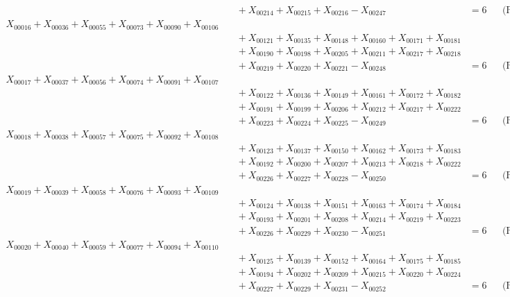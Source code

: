 \documentclass[a4paper,10pt]{article}
\begin{document}
{\begin{align}
&\quad  + X_{00214} + X_{00215} + X_{00216} - X_{00247} &= 6 && \text{(R00016)} \\
X_{00016} + X_{00036} + X_{00055} + X_{00073} + X_{00090} + X_{00106} \\[0.5ex]
&\quad  + X_{00121} + X_{00135} + X_{00148} + X_{00160} + X_{00171} + X_{00181} \\[0.5ex]
&\quad  + X_{00190} + X_{00198} + X_{00205} + X_{00211} + X_{00217} + X_{00218} \\[0.5ex]
&\quad  + X_{00219} + X_{00220} + X_{00221} - X_{00248} &= 6 && \text{(R00017)} \\
X_{00017} + X_{00037} + X_{00056} + X_{00074} + X_{00091} + X_{00107} \\[0.5ex]
&\quad  + X_{00122} + X_{00136} + X_{00149} + X_{00161} + X_{00172} + X_{00182} \\[0.5ex]
&\quad  + X_{00191} + X_{00199} + X_{00206} + X_{00212} + X_{00217} + X_{00222} \\[0.5ex]
&\quad  + X_{00223} + X_{00224} + X_{00225} - X_{00249} &= 6 && \text{(R00018)} \\
X_{00018} + X_{00038} + X_{00057} + X_{00075} + X_{00092} + X_{00108} \\[0.5ex]
&\quad  + X_{00123} + X_{00137} + X_{00150} + X_{00162} + X_{00173} + X_{00183} \\[0.5ex]
&\quad  + X_{00192} + X_{00200} + X_{00207} + X_{00213} + X_{00218} + X_{00222} \\[0.5ex]
&\quad  + X_{00226} + X_{00227} + X_{00228} - X_{00250} &= 6 && \text{(R00019)} \\
X_{00019} + X_{00039} + X_{00058} + X_{00076} + X_{00093} + X_{00109} \\[0.5ex]
&\quad  + X_{00124} + X_{00138} + X_{00151} + X_{00163} + X_{00174} + X_{00184} \\[0.5ex]
&\quad  + X_{00193} + X_{00201} + X_{00208} + X_{00214} + X_{00219} + X_{00223} \\[0.5ex]
&\quad  + X_{00226} + X_{00229} + X_{00230} - X_{00251} &= 6 && \text{(R00020)} \\
\allowbreak
X_{00020} + X_{00040} + X_{00059} + X_{00077} + X_{00094} + X_{00110} \\[0.5ex]
&\quad  + X_{00125} + X_{00139} + X_{00152} + X_{00164} + X_{00175} + X_{00185} \\[0.5ex]
&\quad  + X_{00194} + X_{00202} + X_{00209} + X_{00215} + X_{00220} + X_{00224} \\[0.5ex]
&\quad  + X_{00227} + X_{00229} + X_{00231} - X_{00252} &= 6 && \text{(R00021)} \\

\end{align}}
\end{document}

